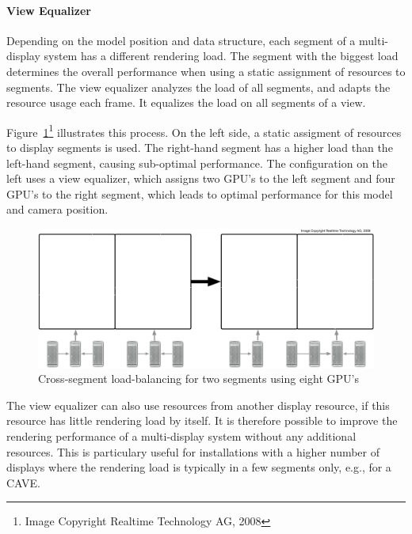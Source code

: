 \documentclass[10pt,a4]{scrartcl}
\newcommand{\fig}[1]{Figure~\ref{#1}}
\begin{document}
\paragraph{View Equalizer}
Depending on the model position and data structure, each segment of a
multi-display system has a different rendering load. The segment with
the biggest load determines the overall performance when using a static
assignment of resources to segments. The view equalizer analyzes the
load of all segments, and adapts the resource usage each frame. It
equalizes the load on all segments of a view.

\fig{fViewLoadBalancing}\footnote{Image Copyright Realtime Technology
  AG, 2008} illustrates this process. On the left side, a static
assigment of resources to display segments is used. The right-hand
segment has a higher load than the left-hand segment, causing
sub-optimal performance. The configuration on the left uses a view
equalizer, which assigns two GPU's to the left segment and four GPU's to
the right segment, which leads to optimal performance for this model and
camera position.

\begin{figure}
  \includegraphics[width=.618\textwidth]{images/viewLB.pdf}
  {\caption{\label{fViewLoadBalancing}\small Cross-segment
      load-balancing for two segments using eight GPU's}}
\end{figure}
The view equalizer can also use resources from another display resource,
if this resource has little rendering load by itself. It is therefore
possible to improve the rendering performance of a multi-display system
without any additional resources. This is particulary useful for
installations with a higher number of displays where the rendering load
is typically in a few segments only, e.g., for a CAVE.
\end{document}

